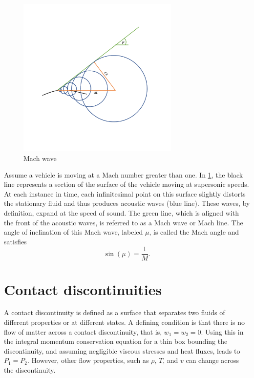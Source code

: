 \documentclass[oneside,a4paper,11pt]{report}
\begin{document}
\begin{figure}[ht]
\centering
\includegraphics[width=8cm]{../../images/mach_wave.pdf}
\caption{Mach wave}
\label{fig:mach_wave}
\end{figure}
Assume a vehicle is moving at a Mach number greater than one. In \cref{fig:mach_wave}, the black line represents a section of the surface of the vehicle moving at supersonic speeds. At each instance in time, each infinitesimal point on this surface slightly distorts the stationary fluid and thus produces acoustic waves (blue line). These waves, by definition, expand at the speed of sound. The green line, which is aligned with the front of the acoustic waves, is referred to as a Mach wave or Mach line. The angle of inclination of this Mach wave, labeled $\mu$, is called the Mach angle and satisfies
\begin{equation}
    \sin (\mu) = \frac{1}{M}.
\end{equation}


\section{Contact discontinuities}
A contact discontinuity is defined as a surface that separates two fluids of different properties or at different states. A defining condition is that there is no flow of matter across a contact discontinuity, that is, $w_1 = w_2 = 0$. Using this in the integral momentum conservation equation for a thin box bounding the discontinuity, and assuming negligible viscous stresses and heat fluxes, leads to $P_1 = P_2$. However, other flow properties, such as $\rho$, $T$, and $v$ can change across the discontinuity.
\end{document}
